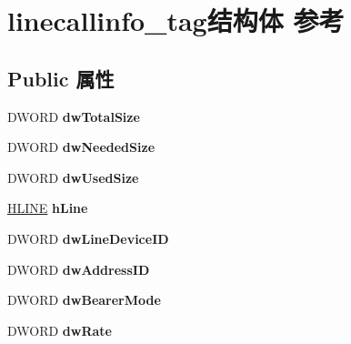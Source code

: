 \hypertarget{structlinecallinfo__tag}{}\section{linecallinfo\+\_\+tag结构体 参考}
\label{structlinecallinfo__tag}
\subsection*{Public 属性}
\begin{DoxyCompactItemize}
\item 
\mbox{\label{structlinecallinfo__tag_ade47286fb699f5b08934c4dc1d045d6c}} 
D\+W\+O\+RD {\bfseries dw\+Total\+Size}
\item 
\mbox{\label{structlinecallinfo__tag_a26b7ef1d99c84274cf627a73c110f81d}} 
D\+W\+O\+RD {\bfseries dw\+Needed\+Size}
\item 
\mbox{\label{structlinecallinfo__tag_a5b98f64bcb0f166c223eb57131c926b1}} 
D\+W\+O\+RD {\bfseries dw\+Used\+Size}
\item 
\mbox{\label{structlinecallinfo__tag_a31c6bf0406253ed78d324bdee8650456}} 
\hyperlink{interfacevoid}{H\+L\+I\+NE} {\bfseries h\+Line}
\item 
\mbox{\label{structlinecallinfo__tag_ab3ec93ff1031aa0d3c8f05a2dc6fded2}} 
D\+W\+O\+RD {\bfseries dw\+Line\+Device\+ID}
\item 
\mbox{\label{structlinecallinfo__tag_a2631af1d4107868a02505d5485e0a3bb}} 
D\+W\+O\+RD {\bfseries dw\+Address\+ID}
\item 
\mbox{\label{structlinecallinfo__tag_abb48ab135416c309ba0550ae31f1f495}} 
D\+W\+O\+RD {\bfseries dw\+Bearer\+Mode}
\item 
\mbox{\label{structlinecallinfo__tag_ad6eb1440abfc46a6e490d6952bb2273a}} 
D\+W\+O\+RD {\bfseries dw\+Rate}
\item 
\mbox{\label{structlinecallinfo__tag_a6c9d9b1fbad72633b0a09581f5002db5}} 

\end{DoxyCompactItemize}
